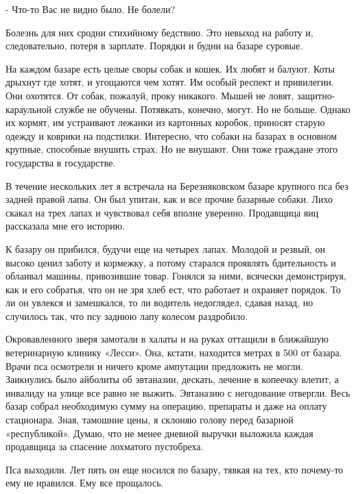 - Что-то Вас не видно было. Не болели?

Болезнь для них сродни стихийному бедствию. Это невыход на работу и,
следовательно, потеря в зарплате. Порядки и будни на базаре суровые. 

На каждом базаре есть целые своры собак и кошек. Их любят и балуют. Коты
дрыхнут где хотят, и угощаются чем хотят. Им особый респект и привилегии. Они
охотятся. От собак, пожалуй, проку никакого. Мышей не ловят, защитно-караульной
службе не обучены. Потявкать, конечно, могут. Но не больше. Однако их кормят,
им устраивают лежанки из картонных коробок, приносят старую одежду и коврики на
подстилки. Интересно, что собаки на базарах в основном крупные, способные
внушить страх. Но не внушают. Они тоже граждане этого государства в
государстве. 

В течение нескольких лет я встречала на Березняковском базаре крупного пса без
задней правой лапы. Он был упитан, как и все прочие базарные собаки. Лихо
скакал на трех лапах и чувствовал себя вполне уверенно. Продавщица яиц
рассказала мне его историю. 

К базару он прибился, будучи еще на четырех лапах. Молодой и резвый, он высоко
ценил заботу и кормежку, а потому старался проявлять бдительность и облаивал
машины, привозившие товар. Гонялся за ними, всячески демонстрируя, как и его
собратья, что он не зря хлеб ест, что работает и охраняет порядок. То ли он
увлекся и замешкался, то ли водитель недоглядел, сдавая назад, но случилось
так, что псу заднюю лапу колесом раздробило. 

Окровавленного зверя замотали в халаты и на руках оттащили в ближайшую
ветеринарную клинику «Лесси». Она, кстати, находится метрах в 500 от базара.
Врачи пса осмотрели и ничего кроме ампутации предложить не могли. Заикнулись
было айболиты об эвтаназии, дескать, лечение в копеечку влетит, а инвалиду на
улице все равно не выжить. Эвтаназию с негодование отвергли. Весь базар собрал
необходимую сумму на операцию, препараты и даже на оплату стационара. Зная,
тамошние цены, я склоняю голову перед базарной «республикой». Думаю, что не
менее дневной выручки выложила каждая продавщица за спасение лохматого
пустобреха. 

Пса выходили. Лет пять он еще носился по базару, тявкая на тех, кто почему-то
ему не нравился. Ему все прощалось.

